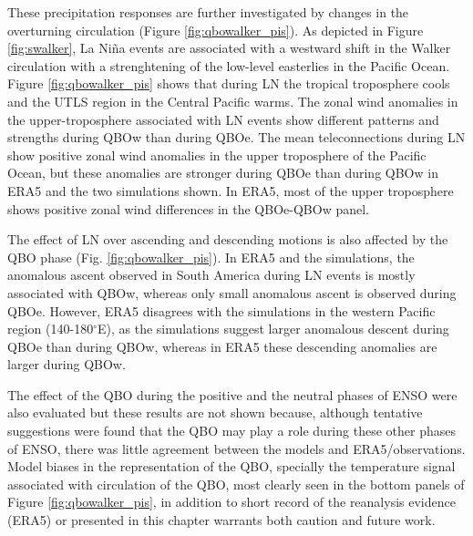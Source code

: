 These precipitation responses are further investigated by changes in the overturning circulation (Figure \ref{fig:qbowalker_pis}). As depicted in Figure \ref{fig:swalker}, La Niña events are associated with a westward shift in the Walker circulation with a strenghtening of the low-level easterlies in the Pacific Ocean. 
Figure \ref{fig:qbowalker_pis} shows that during LN the tropical troposphere cools and the UTLS region in the Central Pacific warms. %
The zonal wind anomalies in the upper-troposphere associated with LN events show different patterns and strengths during QBOw than during QBOe. The mean teleconnections during LN show positive zonal wind anomalies in the upper troposphere of the Pacific Ocean,  but these anomalies are stronger during QBOe than during QBOw in ERA5 and the two simulations shown. In ERA5, most of the upper troposphere shows positive zonal wind differences in the QBOe-QBOw panel. 


The effect of LN over ascending and descending motions is also affected by the QBO phase (Fig. \ref{fig:qbowalker_pis}). In ERA5 and the simulations, the anomalous ascent observed in South America during LN events is mostly associated with QBOw, whereas only small anomalous ascent is observed during QBOe. 
However, ERA5 disagrees with the simulations in the western Pacific region (140-180$^\circ$E), as the simulations suggest larger anomalous descent during QBOe than during QBOw, whereas in ERA5 these descending anomalies are larger during QBOw. 

The effect of the QBO during the positive and the neutral phases of ENSO were also evaluated but these results are not shown because, although tentative suggestions were found that the QBO may play a role during these other phases of ENSO, there was little agreement between the models and ERA5/observations. Model biases in the representation of the QBO, specially the temperature signal associated with circulation of the QBO, most clearly seen in the bottom panels of Figure \ref{fig:qbowalker_pis}, in addition to short record of the reanalysis evidence (ERA5) or presented in this chapter warrants both caution and future work. 

